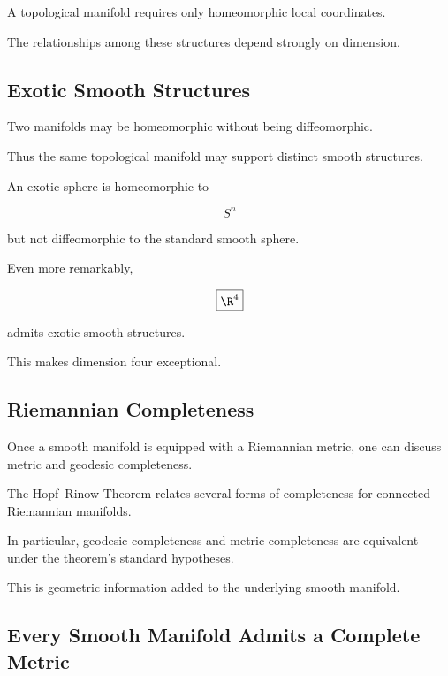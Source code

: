 A topological manifold requires only homeomorphic local coordinates.

The relationships among these structures depend strongly on dimension.

\subsection{Exotic Smooth Structures}
\label{subsec:exotic-smooth-structures-manifolds}

Two manifolds may be homeomorphic without being diffeomorphic.

Thus the same topological manifold may support distinct smooth structures.

An exotic sphere is homeomorphic to

\[
S^n
\]

but not diffeomorphic to the standard smooth sphere.

Even more remarkably,

\[
\boxed{
\R^4
}
\]

admits exotic smooth structures.

This makes dimension four exceptional.

\subsection{Riemannian Completeness}
\label{subsec:riemannian-completeness-manifolds}

Once a smooth manifold is equipped with a Riemannian metric, one can discuss
metric and geodesic completeness.

The Hopf--Rinow Theorem relates several forms of completeness for connected
Riemannian manifolds.

In particular, geodesic completeness and metric completeness are equivalent
under the theorem's standard hypotheses.

This is geometric information added to the underlying smooth manifold.

\subsection{Every Smooth Manifold Admits a Complete Metric}
\label{subsec:complete-riemannian-metric-existence}

